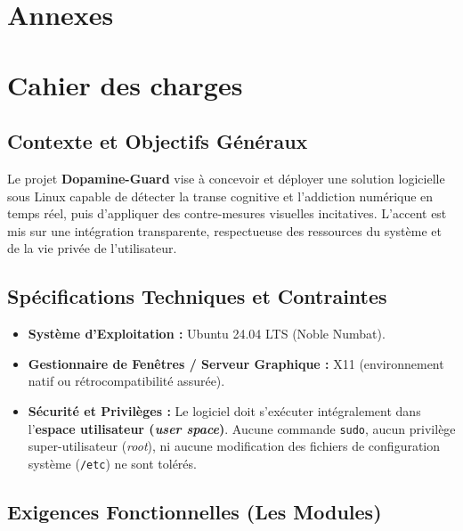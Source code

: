\documentclass[a4paper, 12pt, twoside]{article}
\begin{document}
\newpage

\section{Annexes}
\appendix
\section{Cahier des charges}

\subsection{Contexte et Objectifs Généraux}
Le projet \textbf{Dopamine-Guard} vise à concevoir et déployer une solution logicielle sous Linux capable de détecter la transe cognitive et l'addiction numérique en temps réel, puis d'appliquer des contre-mesures visuelles incitatives. L’accent est mis sur une intégration transparente, respectueuse des ressources du système et de la vie privée de l'utilisateur.

\subsection{Spécifications Techniques et Contraintes}
\begin{itemize}
    \item \textbf{Système d'Exploitation :} Ubuntu 24.04 LTS (Noble Numbat).
    \item \textbf{Gestionnaire de Fenêtres / Serveur Graphique :} X11 (environnement natif ou rétrocompatibilité assurée).
    \item \textbf{Sécurité et Privilèges :} Le logiciel doit s'exécuter intégralement dans l'\textbf{espace utilisateur (\textit{user space})}. Aucune commande \texttt{sudo}, aucun privilège super-utilisateur (\textit{root}), ni aucune modification des fichiers de configuration système (\texttt{/etc}) ne sont tolérés.
\end{itemize}

\subsection{Exigences Fonctionnelles (Les Modules)}
\end{document}
